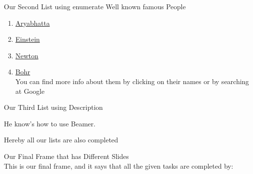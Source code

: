 \documentclass{beamer}
\begin{document}
\begin{frame}[label=page_21]{Our Second List using enumerate}
Well known famous People
\begin{enumerate}
    \item \href{https://en.wikipedia.org/wiki/Aryabhata}{Aryabhatta}\pause 
    \item \href{https://en.wikipedia.org/wiki/Albert_Einstein}{Einstein}\pause 
    \item \href{https://en.wikipedia.org/wiki/Newton}{Newton}\pause 
    \item \href{https://en.wikipedia.org/wiki/Niels_Bohr}{Bohr}\\
    You can find more info about them by clicking on their names
or by searching at Google
\end{enumerate}
\end{frame}

\begin{frame}[label=page_22]{Our Third List using Description}
\begin{description}
    \item[Vivek] He know’s how to use Beamer.
\end{description}
\alert<3>{Hereby all our lists are also completed}
\end{frame}

\begin{frame}{Our Final Frame that has Different Slides}
\\
\alert<1->{This is our final frame, and it says that all the given tasks are
completed by:}\\
\\
\hyperlink{page_2}{}
\pause
\end{frame}
\end{document}
